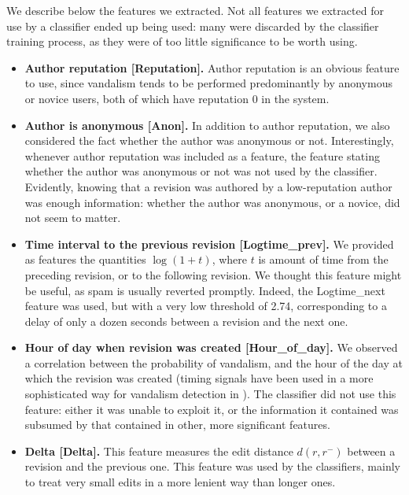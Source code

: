 We describe below the features we extracted.
Not all features we extracted for use by a classifier ended up being used: many were discarded by the classifier training process, as they were of too little significance to be worth using.
%
\begin{itemize}

\item \textbf{Author reputation [Reputation].}  Author reputation is an obvious feature to use, since vandalism tends to be performed predominantly by anonymous or novice users, both of which have reputation 0 in the system.

\item \textbf{Author is anonymous [Anon].}  In addition to author reputation, we also considered the fact whether the author was anonymous or not.
Interestingly, whenever author reputation was included as a feature, the feature stating whether the author was anonymous or not was not used by the classifier.
Evidently, knowing that a revision was authored by a low-reputation author was enough information: whether the author was anonymous, or a novice, did not seem to matter.

\item \textbf{Time interval to the previous revision [Logtime\_prev].}
We provided as features the quantities $\log(1 + t)$, where $t$ is amount of time from the preceding revision, or to the following revision.
We thought this feature might be useful, as spam is usually reverted promptly.
Indeed, the Logtime\_next feature was used, but with a very low threshold of 2.74, corresponding to a delay of only a dozen seconds between a revision and the next one.

\item \textbf{Hour of day when revision was created [Hour\_of\_day].}
We observed a correlation between the probability of vandalism, and the hour of the day at which the revision was created (timing signals have been used in a more sophisticated way for vandalism detection in \cite{West2010}).  The classifier did not use this feature: either it was unable to exploit it, or the information it contained was subsumed by that contained in other, more significant features.

\item \textbf{Delta [Delta].}  This feature measures the edit distance $d(r, r^{-})$ between a revision and the previous one.  This feature was used by the classifiers, mainly to treat very small edits in a more lenient way than longer ones.


\end{itemize}
